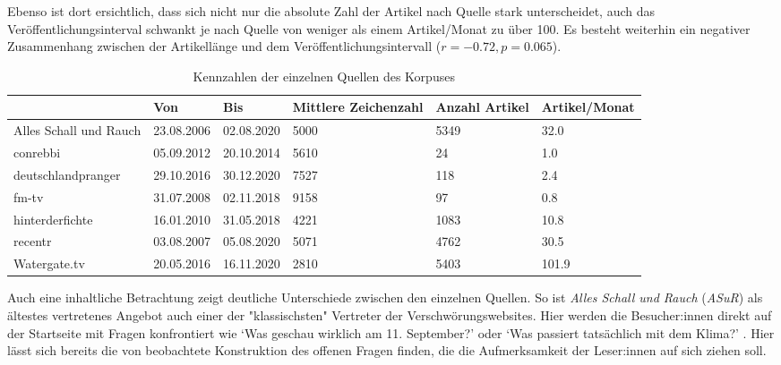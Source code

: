 Ebenso ist dort ersichtlich, dass sich nicht nur die absolute Zahl der Artikel nach Quelle stark unterscheidet, auch das Veröffentlichungsinterval schwankt je nach Quelle von weniger als einem Artikel/Monat zu über 100.
Es besteht weiterhin ein negativer Zusammenhang zwischen der Artikellänge und dem Veröffentlichungsintervall ($r = -0.72, p = 0.065$).

\begin{table}
    \begin{center}
        \begin{tabularx}{\textwidth}{lXXXXX}
            \toprule
            & Von & Bis & Mittlere Zeichenzahl & Anzahl Artikel & Artikel/Monat\\
            \midrule
            Alles Schall und Rauch & 23.08.2006 & 02.08.2020 & 5000 & 5349 & 32.0\\
            conrebbi & 05.09.2012 & 20.10.2014 & 5610 & 24 & 1.0\\
            deutschlandpranger & 29.10.2016 & 30.12.2020 & 7527 & 118 & 2.4\\
            fm-tv & 31.07.2008 & 02.11.2018 & 9158 & 97 & 0.8\\
            hinterderfichte & 16.01.2010 & 31.05.2018 & 4221 & 1083 & 10.8\\
            \addlinespace
            recentr & 03.08.2007 & 05.08.2020 & 5071 & 4762 & 30.5\\
            Watergate.tv & 20.05.2016 & 16.11.2020 & 2810 & 5403 & 101.9\\
            \bottomrule
            \end{tabularx}
        \caption{Kennzahlen der einzelnen Quellen des Korpuses}
        \label{corpus-stats}
    \end{center}
\end{table}

Auch eine inhaltliche Betrachtung zeigt deutliche Unterschiede zwischen den einzelnen Quellen.
So ist \textit{Alles Schall und Rauch} (\textit{ASuR}) als ältestes vertretenes Angebot auch einer der "klassischsten" Vertreter der Verschwörungswebsites.
Hier werden die Besucher:innen direkt auf der Startseite mit Fragen konfrontiert wie \enquote*{Was geschau wirklich am 11. September?} oder \enquote*{Was passiert tatsächlich mit dem Klima?} \parencite{asur-homepage}.
Hier lässt sich bereits die von \textcite[][205]{filatkina_2018} beobachtete Konstruktion des offenen Fragen finden, die die Aufmerksamkeit der Leser:innen auf sich ziehen soll.

